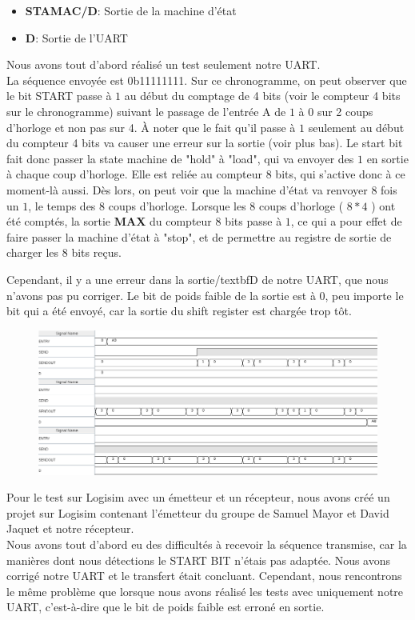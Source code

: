 \documentclass[a4paper]{article} %
\begin{document}
\begin{tcolorbox}[colframe=Monokaimagenta,colback=white]
\begin{itemize}
    \item     \textbf{STAMAC/D}: Sortie de la machine d'état
    \item     \textbf{D}: Sortie de l'UART
\end{itemize}
Nous avons tout d'abord réalisé un test seulement notre UART.\\
La séquence envoyée est 0b11111111. Sur ce chronogramme, on peut observer que le bit START passe à $1$ au début du comptage de 4 bits (voir le compteur 4 bits sur le chronogramme) suivant le passage de l'entrée A de $1$ à $0$ sur 2 coups d'horloge et non pas sur 4. À noter que le fait qu'il passe à $1$ seulement au début du compteur 4 bits va causer une erreur sur la sortie (voir plus bas).
Le start bit fait donc passer la state machine de "hold" à "load", qui va envoyer des $1$ en sortie à chaque coup d'horloge. Elle est reliée au compteur 8 bits, qui s'active donc à ce moment-là aussi. Dès lors, on peut voir que la machine d'état va renvoyer 8 fois un $1$, le temps des 8 coups d'horloge. Lorsque les 8 coups d'horloge ( $8*4$ ) ont été comptés, la sortie \textbf{MAX} du compteur 8 bits passe à $1$, ce qui a pour effet de faire passer la machine d'état à "stop", et de permettre au registre de sortie de charger les 8 bits reçus.
\end{tcolorbox}

\begin{tcolorbox}[colframe=Monokaimagenta,colback=white]

Cependant, il y a une erreur dans la sortie/textbf{D} de notre UART, que nous n'avons pas pu corriger. Le bit de poids faible de la sortie est à 0, peu importe le bit qui a été envoyé, car la sortie du shift register est chargée trop tôt.\\
\begin{figure}[H]
\centering
    \includegraphics[width=1\textwidth]{src/CHRONO_EMISSION.png}
    \label{fig:chrono_emetteur}
\end{figure}
Pour le test sur Logisim avec un émetteur et un récepteur, nous avons créé un projet sur Logisim contenant l'émetteur du groupe de Samuel Mayor et David Jaquet et notre récepteur.\\
Nous avons tout d'abord eu des difficultés à recevoir la séquence transmise, car la manières dont nous détections le START BIT n'étais pas adaptée. Nous avons corrigé notre UART et le transfert était concluant. Cependant, nous rencontrons le même problème que lorsque nous avons réalisé les tests avec uniquement notre UART, c'est-à-dire que le bit de poids faible est erroné en sortie.
\end{tcolorbox}
\pagebreak
\end{document}
